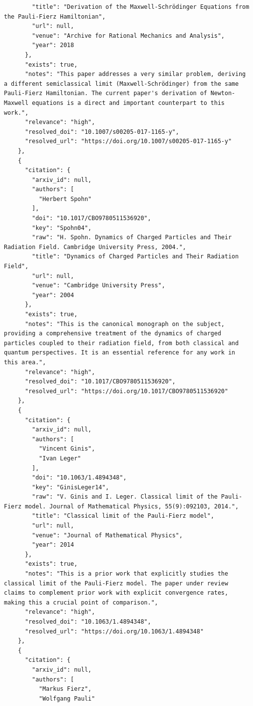 \documentclass[11pt]{article}
\begin{document}
\begin{verbatim}
        "title": "Derivation of the Maxwell-Schrödinger Equations from the Pauli-Fierz Hamiltonian",
        "url": null,
        "venue": "Archive for Rational Mechanics and Analysis",
        "year": 2018
      },
      "exists": true,
      "notes": "This paper addresses a very similar problem, deriving a different semiclassical limit (Maxwell-Schrödinger) from the same Pauli-Fierz Hamiltonian. The current paper's derivation of Newton-Maxwell equations is a direct and important counterpart to this work.",
      "relevance": "high",
      "resolved_doi": "10.1007/s00205-017-1165-y",
      "resolved_url": "https://doi.org/10.1007/s00205-017-1165-y"
    },
    {
      "citation": {
        "arxiv_id": null,
        "authors": [
          "Herbert Spohn"
        ],
        "doi": "10.1017/CBO9780511536920",
        "key": "Spohn04",
        "raw": "H. Spohn. Dynamics of Charged Particles and Their Radiation Field. Cambridge University Press, 2004.",
        "title": "Dynamics of Charged Particles and Their Radiation Field",
        "url": null,
        "venue": "Cambridge University Press",
        "year": 2004
      },
      "exists": true,
      "notes": "This is the canonical monograph on the subject, providing a comprehensive treatment of the dynamics of charged particles coupled to their radiation field, from both classical and quantum perspectives. It is an essential reference for any work in this area.",
      "relevance": "high",
      "resolved_doi": "10.1017/CBO9780511536920",
      "resolved_url": "https://doi.org/10.1017/CBO9780511536920"
    },
    {
      "citation": {
        "arxiv_id": null,
        "authors": [
          "Vincent Ginis",
          "Ivan Leger"
        ],
        "doi": "10.1063/1.4894348",
        "key": "GinisLeger14",
        "raw": "V. Ginis and I. Leger. Classical limit of the Pauli-Fierz model. Journal of Mathematical Physics, 55(9):092103, 2014.",
        "title": "Classical limit of the Pauli-Fierz model",
        "url": null,
        "venue": "Journal of Mathematical Physics",
        "year": 2014
      },
      "exists": true,
      "notes": "This is a prior work that explicitly studies the classical limit of the Pauli-Fierz model. The paper under review claims to complement prior work with explicit convergence rates, making this a crucial point of comparison.",
      "relevance": "high",
      "resolved_doi": "10.1063/1.4894348",
      "resolved_url": "https://doi.org/10.1063/1.4894348"
    },
    {
      "citation": {
        "arxiv_id": null,
        "authors": [
          "Markus Fierz",
          "Wolfgang Pauli"

\end{verbatim}
\end{document}
